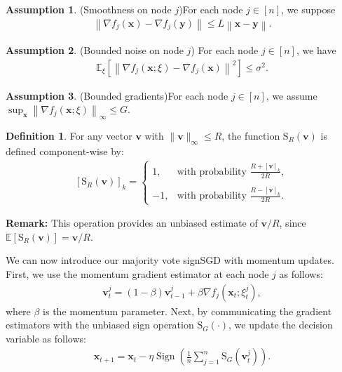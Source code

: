 \documentclass[10pt,a4paper]{amsart}
\theoremstyle{plain}
\theoremstyle{definition}
\newtheorem{definition}{Definition}
\newtheorem{ass}{Assumption}
\def \E {\mathbb{E}}
\newcommand{\Norm}[1]{\left\|#1\right\|}
\def \v {\mathbf{v}}
\def \x {\mathbf{x}}
\def \y {\mathbf{y}}
\begin{document}
\begin{ass}(Smoothness on node $j$)\label{smooth-j} For each node $j\in[n]$, we suppose
    \begin{align*}
        \Norm{\nabla f_j(\x)-\nabla f_j(\y)}\le L\Norm{\x-\y}.
    \end{align*}
\end{ass}
\begin{ass}\label{ass:3++}  (Bounded noise on node $j$) For each node $j\in[n]$, we have
\begin{equation*}
\begin{split}
 \mathbb{E}_{\xi}\left[\left\|\nabla f_j(\x;\xi) -\nabla f_j(\mathbf{x})\right\|^{2}\right] \leq \sigma^{2}.
\end{split}
\end{equation*} 
\end{ass}

\begin{ass}(Bounded gradients)\label{bg1}
    For each node $j\in[n]$, we assume $\sup_{\x} \Norm{\nabla f_j(\x;\xi)}_\infty\le G$.
\end{ass}

\begin{definition}
    For any vector \( \v \) with \( \|\v\|_{\infty} \leq R \), the function $\operatorname{S_\textit{R}}(\v)$ is defined component-wise by:
    \begin{align}\label{mapping}
    [\operatorname{S_\textit{R}}(\v)]_k = \begin{cases}
        1, & \text{with probability } \frac{R+[\v]_k}{2R}, \\ \\
        -1, & \text{with probability } \frac{R-[\v]_k}{2R}.
    \end{cases}
    \end{align}
\end{definition}

\textbf{Remark:} This operation provides an unbiased estimate of \( {\v}/{R} \), since \( \E[\operatorname{S_\textit{R}}(\v)] = {\v}/{R} \). 

We can now introduce our majority vote signSGD with momentum updates. First, we use the momentum gradient estimator at each node $j$ as follows:
\begin{align}
    \v_t^j = (1-\beta) \v_{t-1}^j + \beta \nabla f_j(\x_t;\xi_t^{j}),
\end{align}
where $\beta$ is the momentum parameter. Next, by communicating the gradient estimators with the unbiased sign operation $\operatorname{S_\textit{G}}(\cdot)$, we update the decision variable as follows:
\begin{align}
    \x_{t+1} = \x_t - \eta \operatorname{Sign}\left(\frac{1}{n} \sum_{j=1}^{n} \operatorname{S_\textit{G}}(\v_t^j) \right).
\end{align} 
\end{document}
